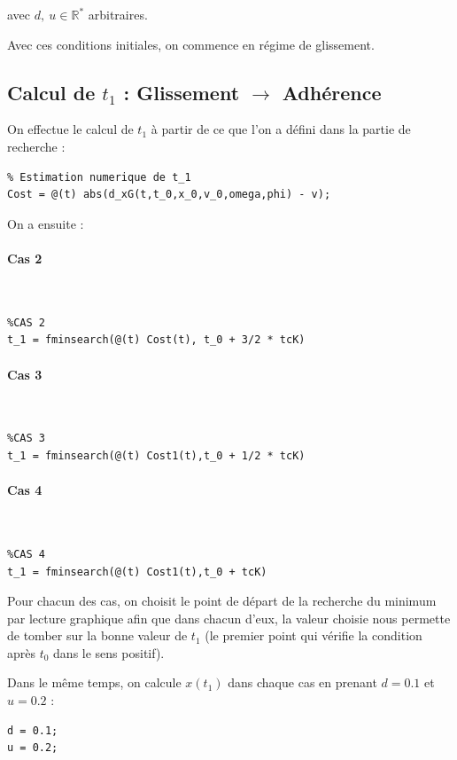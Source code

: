 \documentclass{article}
\begin{document}
avec $d,~u\in \mathbb{R}^*$ arbitraires.

Avec ces conditions initiales, on commence en régime de glissement.

\subsection{Calcul de $t_1$ : Glissement $\rightarrow$ Adhérence}
On effectue le calcul de $t_1$ à partir de ce que l'on a défini dans la partie de recherche :

\begin{lstlisting}
% Estimation numerique de t_1
Cost = @(t) abs(d_xG(t,t_0,x_0,v_0,omega,phi) - v);
\end{lstlisting}

On a ensuite :
\paragraph{Cas 2}
$ $
\begin{lstlisting}
%CAS 2
t_1 = fminsearch(@(t) Cost(t), t_0 + 3/2 * tcK)		
\end{lstlisting}

\paragraph{Cas 3}
$ $
\begin{lstlisting}
%CAS 3
t_1 = fminsearch(@(t) Cost1(t),t_0 + 1/2 * tcK)		
\end{lstlisting}

\paragraph{Cas 4}
$ $
\begin{lstlisting}
%CAS 4
t_1 = fminsearch(@(t) Cost1(t),t_0 + tcK)		
\end{lstlisting}

Pour chacun des cas, on choisit le point de départ de la recherche du minimum par lecture graphique afin que dans chacun d'eux, la valeur choisie nous permette de tomber sur la bonne valeur de $t_1$ (le premier point qui vérifie la condition après $t_0$ dans le sens positif). 

Dans le même temps, on calcule $x(t_1)$ dans chaque cas en prenant $d=0.1$ et $u=0.2$ : 

\begin{lstlisting}
d = 0.1;
u = 0.2;
\end{lstlisting}
\end{document}

